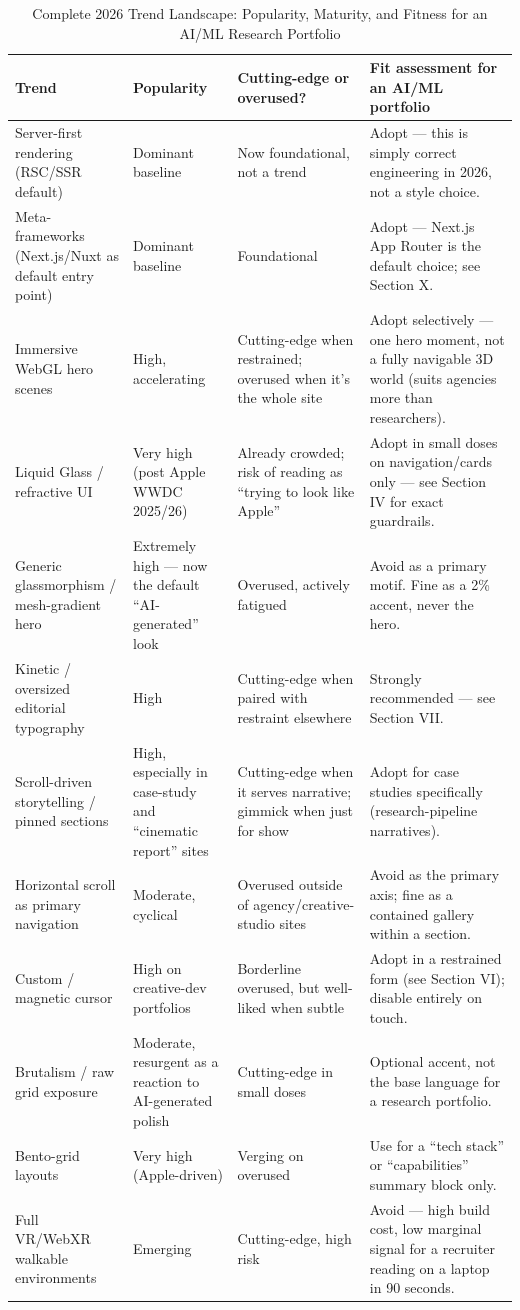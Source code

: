 \documentclass[conference]{IEEEtran}
\begin{document}
\begin{table}[t]
\centering
\caption{Complete 2026 Trend Landscape: Popularity, Maturity, and Fitness for an AI/ML Research Portfolio}
\label{tab:trends_full}
\begin{tabular}{L{2.6cm}L{1.8cm}L{2.6cm}L{7.6cm}}
\toprule
\textbf{Trend} & \textbf{Popularity} & \textbf{Cutting-edge or overused?} & \textbf{Fit assessment for an AI/ML portfolio} \\
\midrule
Server-first rendering (RSC/SSR default) & Dominant baseline & Now foundational, not a trend & Adopt --- this is simply correct engineering in 2026, not a style choice. \\
Meta-frameworks (Next.js/Nuxt as default entry point) & Dominant baseline & Foundational & Adopt --- Next.js App Router is the default choice; see Section X. \\
Immersive WebGL hero scenes & High, accelerating & Cutting-edge when restrained; overused when it's the whole site & Adopt selectively --- one hero moment, not a fully navigable 3D world (suits agencies more than researchers). \\
Liquid Glass / refractive UI & Very high (post Apple WWDC 2025/26) & Already crowded; risk of reading as ``trying to look like Apple'' & Adopt in small doses on navigation/cards only --- see Section IV for exact guardrails. \\
Generic glassmorphism / mesh-gradient hero & Extremely high --- now the default ``AI-generated'' look & Overused, actively fatigued & Avoid as a primary motif. Fine as a 2\% accent, never the hero. \\
Kinetic / oversized editorial typography & High & Cutting-edge when paired with restraint elsewhere & Strongly recommended --- see Section VII. \\
Scroll-driven storytelling / pinned sections & High, especially in case-study and ``cinematic report'' sites & Cutting-edge when it serves narrative; gimmick when just for show & Adopt for case studies specifically (research-pipeline narratives). \\
Horizontal scroll as primary navigation & Moderate, cyclical & Overused outside of agency/creative-studio sites & Avoid as the primary axis; fine as a contained gallery within a section. \\
Custom / magnetic cursor & High on creative-dev portfolios & Borderline overused, but well-liked when subtle & Adopt in a restrained form (see Section VI); disable entirely on touch. \\
Brutalism / raw grid exposure & Moderate, resurgent as a reaction to AI-generated polish & Cutting-edge in small doses & Optional accent, not the base language for a research portfolio. \\
Bento-grid layouts & Very high (Apple-driven) & Verging on overused & Use for a ``tech stack'' or ``capabilities'' summary block only. \\
Full VR/WebXR walkable environments & Emerging & Cutting-edge, high risk & Avoid --- high build cost, low marginal signal for a recruiter reading on a laptop in 90 seconds. \\
\bottomrule
\end{tabular}
\end{table}
\end{document}
